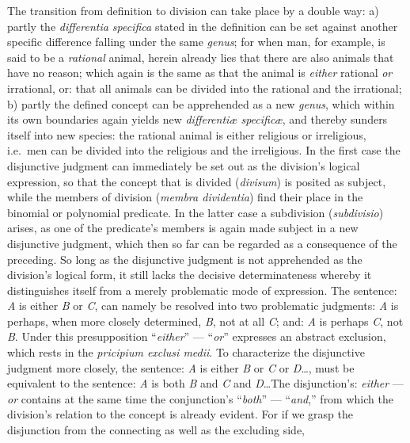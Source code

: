 \documentclass[12pt]{book}
\begin{document}
The transition from definition to division can take place by a double way:
a) partly the \textit{differentia specifica} stated in the definition can be
set against another specific difference falling under the same
\textit{genus}; for when man, for example, is said to be a \emph{rational}
animal, herein already lies that there are also animals that have no reason;
which again is the same as that the animal is \emph{either} rational
\emph{or} irrational, or: that all animals can be divided into the rational
and the irrational; b) partly the defined concept can be apprehended as a
new \textit{genus}, which within its own boundaries again yields new
\textit{differentiæ specificæ}, and thereby sunders itself into new species:
the rational animal is either religious or irreligious, i.e.\ men can be
divided into the religious and the irreligious. In the first case the
disjunctive judgment can immediately be set out as the division's logical
expression, so that the concept that is divided (\textit{divisum}) is
posited as subject, while the members of division (\textit{membra
dividentia}) find their place in the binomial or polynomial predicate. In
the latter case a subdivision (\textit{subdivisio}) arises, as one of the
predicate's members is again made subject in a new disjunctive judgment,
which then so far can be regarded as a consequence of the preceding. So long
as the disjunctive judgment is not apprehended as the division's logical
form, it still lacks the decisive determinateness whereby it distinguishes
itself from a merely problematic mode of expression. The sentence:
\textit{A} is either \textit{B} or \textit{C}, can namely be resolved into
two problematic judgments: \textit{A} is perhaps, when more closely
determined, \textit{B}, not at all \textit{C}; and: \textit{A} is perhaps
\textit{C}, not \textit{B}. Under this presupposition ``\emph{either}'' ---
``\emph{or}'' expresses an abstract exclusion, which rests in the
\textit{pricipium exclusi medii}.
To characterize the disjunctive judgment more closely, the sentence:
\textit{A} is either \textit{B} or \textit{C} or \textit{D}\ldots, must be
equivalent to the sentence: \textit{A} is both \textit{B} and \textit{C} and
\textit{D}\ldots The disjunction's: \emph{either} --- \emph{or} contains at
the same time the conjunction's ``\emph{both}'' --- ``\emph{and},'' from
which the division's relation to the concept is already evident. For if we
grasp the disjunction from the connecting as well as the excluding side,
\end{document}
